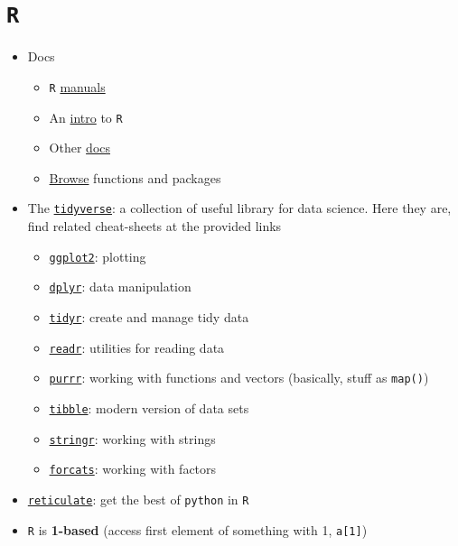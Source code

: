\documentclass[a4paper,12pt,%
              final%
              ]{article}
\begin{document}
\section{\texttt{R}}
\begin{itemize}
  \item Docs
    \begin{itemize}
      \item \texttt{R} \href{https://cran.r-project.org/manuals.html}{manuals}
      \item An \href{https://cran.r-project.org/doc/manuals/r-release/R-intro.pdf}{intro} to \texttt{R}
      \item Other \href{https://www.r-project.org/other-docs.html}{docs}
      \item \href{https://www.rdocumentation.org/}{Browse} functions and packages
    \end{itemize}
  \item The \href{https://www.tidyverse.org/}{\texttt{tidyverse}}: a collection of useful library for data science. Here they are, find related cheat-sheets at the provided links
    \begin{itemize}
      \item \href{https://ggplot2.tidyverse.org/}{\texttt{ggplot2}}: plotting
      \item \href{https://dplyr.tidyverse.org/}{\texttt{dplyr}}: data manipulation
      \item \href{https://tidyr.tidyverse.org/}{\texttt{tidyr}}: create and manage tidy data
      \item \href{https://readr.tidyverse.org/}{\texttt{readr}}: utilities for reading data
      \item \href{https://purrr.tidyverse.org/}{\texttt{purrr}}: working with functions and vectors (basically, stuff as \verb|map()|)
      \item \href{https://tibble.tidyverse.org/}{\texttt{tibble}}: modern version of data sets
      \item \href{https://stringr.tidyverse.org/}{\texttt{stringr}}: working with strings
      \item \href{https://forcats.tidyverse.org/}{\texttt{forcats}}: working with factors
    \end{itemize}
  \item \href{https://github.com/rstudio/reticulate}{\texttt{reticulate}}: get the best of \texttt{python} in \texttt{R}
  \item \texttt{R} is \textbf{1-based} (access first element of something with 1, \verb|a[1]|)

\end{itemize}
\end{document}
